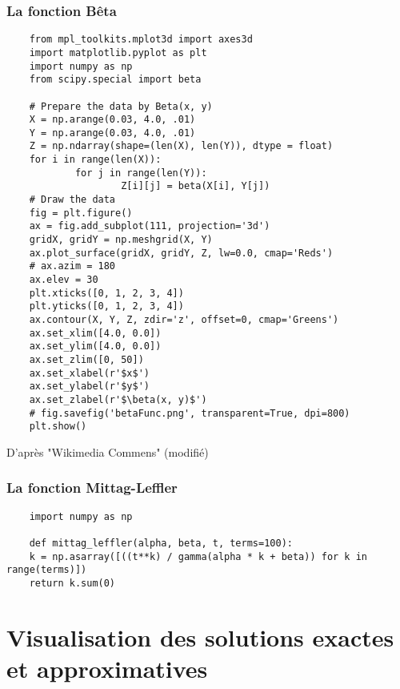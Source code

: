 \subsubsection*{La fonction Bêta}

\noindent
\begin{verbatim}
    from mpl_toolkits.mplot3d import axes3d
    import matplotlib.pyplot as plt
    import numpy as np
    from scipy.special import beta
    
    # Prepare the data by Beta(x, y)
    X = np.arange(0.03, 4.0, .01)
    Y = np.arange(0.03, 4.0, .01)
    Z = np.ndarray(shape=(len(X), len(Y)), dtype = float)
    for i in range(len(X)):
            for j in range(len(Y)):
                    Z[i][j] = beta(X[i], Y[j])
    # Draw the data
    fig = plt.figure()
    ax = fig.add_subplot(111, projection='3d')
    gridX, gridY = np.meshgrid(X, Y)
    ax.plot_surface(gridX, gridY, Z, lw=0.0, cmap='Reds')
    # ax.azim = 180
    ax.elev = 30
    plt.xticks([0, 1, 2, 3, 4])
    plt.yticks([0, 1, 2, 3, 4])
    ax.contour(X, Y, Z, zdir='z', offset=0, cmap='Greens')
    ax.set_xlim([4.0, 0.0])
    ax.set_ylim([4.0, 0.0])
    ax.set_zlim([0, 50])
    ax.set_xlabel(r'$x$')
    ax.set_ylabel(r'$y$')
    ax.set_zlabel(r'$\beta(x, y)$')
    # fig.savefig('betaFunc.png', transparent=True, dpi=800)
    plt.show()
\end{verbatim}
D'après "Wikimedia Commens" (modifié) \cite{plot:wiki_beta}

\subsubsection*{La fonction Mittag-Leffler}

\noindent
\begin{verbatim}
    import numpy as np
    
    def mittag_leffler(alpha, beta, t, terms=100):
    k = np.asarray([((t**k) / gamma(alpha * k + beta)) for k in range(terms)])
    return k.sum(0)
\end{verbatim}

\section{Visualisation des solutions exactes et approximatives}
